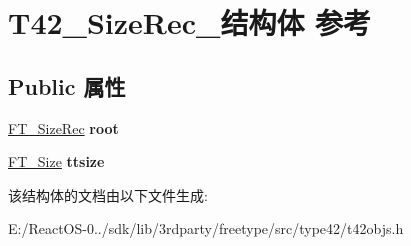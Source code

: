 \hypertarget{struct_t42___size_rec__}{}\section{T42\+\_\+\+Size\+Rec\+\_\+结构体 参考}
\label{struct_t42___size_rec__}
\subsection*{Public 属性}
\begin{DoxyCompactItemize}
\item 
\mbox{\label{struct_t42___size_rec___a92ff1c7203b325eac9d9849a1e349af1}} 
\hyperlink{struct_f_t___size_rec__}{F\+T\+\_\+\+Size\+Rec} {\bfseries root}
\item 
\mbox{\label{struct_t42___size_rec___ad04a45304bd0013d84332d5ceff1627b}} 
\hyperlink{struct_f_t___size_rec__}{F\+T\+\_\+\+Size} {\bfseries ttsize}
\end{DoxyCompactItemize}


该结构体的文档由以下文件生成\+:\begin{DoxyCompactItemize}
\item 
E\+:/\+React\+O\+S-\/0../sdk/lib/3rdparty/freetype/src/type42/t42objs.\+h\end{DoxyCompactItemize}
